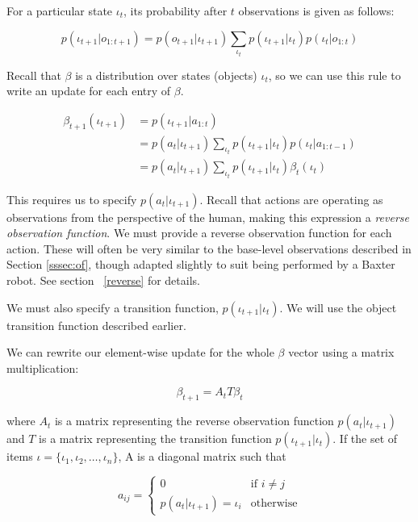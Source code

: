 \documentclass[conference]{IEEEtran}
\begin{document}
For a particular state $\iota_t$, its probability after $t$ observations is given as follows: 

\begin{equation*}
	p(\iota_{t+1} | o_{1:t+1}) = p(o_{t+1} | \iota_{t+1}) \sum_{\iota_{t}} p(\iota_{t+1} | \iota_{t}) p (\iota_{t} | o_{1:t})
\end{equation*}

Recall that $\beta$ is a distribution over states (objects) $\iota_t$, so we can use this rule to write an update for each entry of $\beta$. 

\begin{align*}
	\beta_{t+1}(\iota_{t+1})&= p(\iota_{t+1} | a_{1:t})  \\
	&= p(a_{t} | \iota_{t+1}) \sum_{\iota_{t}} p(\iota_{t+1} | \iota_{t}) p (\iota_{t} | a_{1:t-1}) \\ 
	&= p(a_{t} | \iota_{t+1}) \sum_{\iota_{t}} p(\iota_{t+1} | \iota_{t}) \beta_{t}(\iota_{t}) 
\end{align*}

This requires us to specify $p(a_{t} | \iota_{t+1})$. Recall that actions are operating as observations from the perspective of the human, making this expression a \emph{reverse observation function}. We must provide a reverse observation function for each action. These will often be very similar to the base-level observations described in Section \ref{sssec:of}, though adapted slightly to suit being performed by a Baxter robot. See section ~\ref{reverse} for details. 

We must also specify a transition function, $p(\iota_{t+1} | \iota_t)$. We will use the object transition function described earlier. 

We can rewrite our element-wise update for the whole $\beta$ vector using a matrix multiplication: 


$$\beta_{t+1} = A_{t}T \beta_{t}$$


where $A_{t}$ is a matrix representing the reverse observation function $p(a_{t} | \iota_{t+1})$ and $T$ is a matrix representing the transition function $p(\iota_{t+1}|\iota_{t})$.  If the set of items $\mathcal{\iota} = \{ \iota_1, \iota_2, \ldots, \iota_n\}$, A is a diagonal matrix such that

\begin{equation*}
	a_{ij} = \begin{cases}
		0 & \text{if } i \ne j \\
		p(a_t | \iota_{t+1}) = \iota_i & \text{otherwise}
	\end{cases}
\end{equation*}
\end{document}
